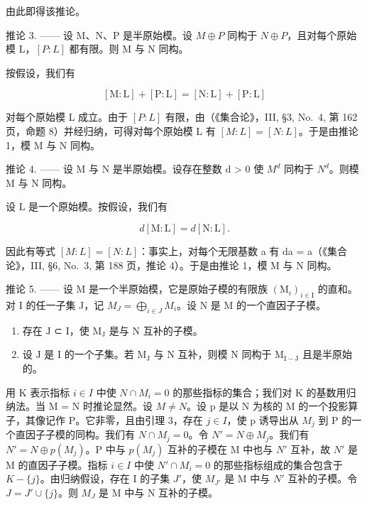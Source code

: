 由此即得该推论。

推论 3. —— 设 M、N、P 是半原始模。设 \(M \oplus P\) 同构于 \(N \oplus P\)，且对每个原始模 L，\([P : L]\) 都有限。则 M 与 N 同构。

按假设，我们有

\[
[ \mathrm{M}: \mathrm{L} ] + [ \mathrm{P}: \mathrm{L} ] = [ \mathrm{N}: \mathrm{L} ] + [ \mathrm{P}: \mathrm{L} ]
\]

对每个原始模 L 成立。由于 \([P:L]\) 有限，由（《集合论》，III, §3, No.~4, 第 162 页，命题 8）并经归纳，可得对每个原始模 L 有 \([M:L]=[N:L]\)。于是由推论 1，模 M 与 N 同构。

推论 4. —— 设 M 与 N 是半原始模。设存在整数 d \textgreater{} 0 使 \(M^{d}\) 同构于 \(N^{d}\)。则模 M 与 N 同构。

设 \(\mathrm{L}\) 是一个原始模。按假设，我们有

\[
d [ \mathrm{M}: \mathrm{L} ] = d [ \mathrm{N}: \mathrm{L} ].
\]

因此有等式 \([M:L]=[N:L]\)：事实上，对每个无限基数 a 有 da = a（《集合论》，III, §6, No.~3, 第 188 页，推论 4）。于是由推论 1，模 M 与 N 同构。

推论 5. —— 设 M 是一个半原始模，它是原始子模的有限族 \((\mathrm{M}_{i})_{i\in\mathrm{I}}\) 的直和。对 I 的任一子集 J，记 \(M_{J}=\bigoplus_{i\in J}M_{i}\)。设 N 是 M 的一个直因子子模。

\begin{enumerate}
\def\labelenumi{\alph{enumi})}
\item
  存在 \(\mathrm{J}\) ⊂ \(\mathrm{I}\)，使 \(\mathrm{M}_{\mathrm{J}}\) 是与 \(\mathrm{N}\) 互补的子模。
\item
  设 \(\mathrm{J}\) 是 \(\mathrm{I}\) 的一个子集。若 \(\mathrm{M}_{\mathrm{J}}\) 与 \(\mathrm{N}\) 互补，则模 \(\mathrm{N}\) 同构于 \(\mathrm{M}_{\mathrm{I - J}}\) 且是半原始的。
\end{enumerate}

用 K 表示指标 \(i \in I\) 中使 \(N \cap M_{i} = 0\) 的那些指标的集合；我们对 K 的基数用归纳法。当 M = N 时推论显然。设 \(M \neq N\)。设 p 是以 N 为核的 M 的一个投影算子，其像记作 P。它非零，且由引理 3，存在 \(j \in I\)，使 p 诱导出从 \(M_{j}\) 到 P 的一个直因子子模的同构。我们有 \(N \cap M_{j} = 0\)。令 \(N' = N \oplus M_{j}\)。我们有 \(N' = N \oplus p(M_{j})\)。P 中与 \(p(M_{j})\) 互补的子模在 M 中也与 \(N'\) 互补，故 \(N'\) 是 M 的直因子子模。指标 \(i \in I\) 中使 \(N' \cap M_{i} = 0\) 的那些指标组成的集合包含于 \(K - \{j\}\)。由归纳假设，存在 I 的子集 \(J'\)，使 \(M_{J'}\) 是 M 中与 \(N'\) 互补的子模。令 \(J = J' \cup \{j\}\)。则 \(M_{J}\) 是 M 中与 N 互补的子模。

